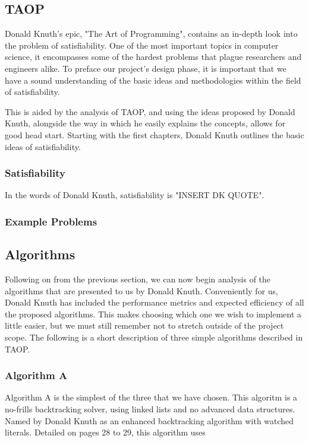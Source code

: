 \documentclass{article}
\begin{document}
\subsection{TAOP}
Donald Knuth's epic, "The Art of Programming", contains an in-depth look into the problem of satisfiability. One of the most important topics in computer
science, it encompasses some of the hardest problems that plague researchers and engineers alike. To preface our project's design phase, it is important
that we have a sound understanding of the basic ideas and methodologies within the field of satisfiability.

This is aided by the analysis of TAOP, and using the ideas proposed by Donald Knuth, alongside the way in which he easily explains the concepts, allows
for good head start. Starting with the first chapters, Donald Knuth outlines the basic ideas of satisfiability.

\subsubsection{Satisfiability}
In the words of Donald Knuth, satisfiability is "INSERT DK QUOTE".

\subsubsection{Example Problems}

\subsection{Algorithms}
Following on from the previous section, we can now begin analysis of the algorithms that are presented to us by Donald Knuth. Conveniently for us,
Donald Knuth has included the performance metrics and expected efficiency of all the proposed algorithms. This makes choosing which one we wish to implement
a little easier, but we must still remember not to stretch outside of the project scope. The following is a short description of three simple algorithms
described in TAOP. %

\subsubsection{Algorithm A}
Algorithm A is the simplest of the three that we have chosen. This algoritm is a no-frills backtracking solver, using linked lists and no advanced data
structures. Named by Donald Knuth as an enhanced backtracking algorithm with watched literals. Detailed on pages 28 to 29, this algorithm
uses 
\end{document}
